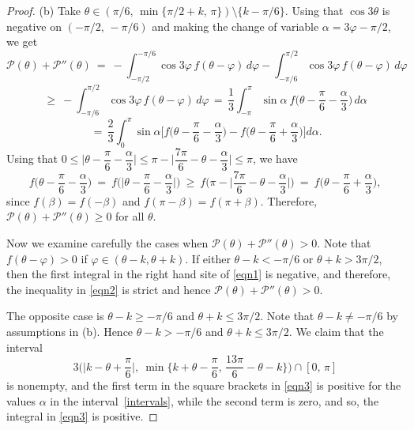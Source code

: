 \documentclass[a4paper,12pt]{article}
\newcommand {\PPP}{\mathcal{P}}
\theoremstyle{remark}
\theoremstyle{definition}
\begin{document}
\begin{proof}
(b) Take $\theta \in (\pi/6,\, \min\{\pi/2 + k,\, \pi \}) \setminus \{ k-\pi/6 \}$. Using that $\cos 3\theta$ is negative on $(-\pi/2,\, -\pi/6)$ and making the change of variable $\alpha = 3\varphi - \pi/2$, we get
\begin{equation}\label{eqn1}
\PPP(\theta) + \PPP''(\theta)\ =\
-\int_{-\pi/2}^{-\pi/6} \cos 3\varphi\, f(\theta-\varphi)\, d\varphi
-\int_{-\pi/6}^{\pi/2} \cos 3\varphi\, f(\theta-\varphi)\, d\varphi
 \end{equation}
 \begin{equation}\label{eqn2}
 \ge\
-\int_{-\pi/6}^{\pi/2} \cos 3\varphi\, f(\theta-\varphi)\, d\varphi\, =\,
\dfrac{1}{3}\int_{-\pi}^{\pi} \sin\alpha\ f\Big(\theta - \frac{\pi}{6} - \dfrac{\alpha}{3} \Big)\, d\alpha
\end{equation}
 \begin{equation}\label{eqn3}
\, =\,
\dfrac{2}{3}\int_{0}^{\pi} \sin\alpha
\Big[ f\Big(\theta - \frac{\pi}{6} - \dfrac{\alpha}{3} \Big) - f\Big(\theta - \frac{\pi}{6} + \dfrac{\alpha}{3} \Big)
\Big] d\alpha.
\end{equation}
Using that $0 \le \Big|\theta - \dfrac{\pi}{6} - \dfrac{\alpha}{3}\Big| \le \pi - \Big|\dfrac{7\pi}{6} - \theta - \dfrac{\alpha}{3}\Big| \le \pi$, we have
$$
f\Big(\theta - \dfrac{\pi}{6} - \dfrac{\alpha}{3} \Big)\ =\ f\Big(\Big|\theta - \dfrac{\pi}{6} - \dfrac{\alpha}{3} \Big|\Big)\ \ge\
f\Big(\pi - \Big|\dfrac{7\pi}{6} - \theta - \dfrac{\alpha}{3}\Big|\Big) \ =\ f\Big(\theta - \dfrac{\pi}{6} + \dfrac{\alpha}{3} \Big),$$
since $f(\beta)=f(-\beta)$ and $f(\pi-\beta)=f(\pi+\beta)$. Therefore, $\PPP(\theta) + \PPP''(\theta) \ge 0$ for all $\theta$.

Now we examine carefully the cases when $\PPP(\theta) + \PPP''(\theta) > 0$. Note that $f(\theta-\varphi)>0$ if $\varphi\in(\theta-k,\theta+k)$. If either $\theta - k<-\pi/6$ or $\theta + k > 3\pi/2$, then the first integral in the right hand site of \eqref{eqn1} is negative, and therefore, the inequality in \eqref{eqn2} is strict and hence $\PPP(\theta)+\PPP''(\theta)>0$.

The opposite case is $\theta -k \ge - \pi/6$ and $\theta + k \le 3\pi/2$. Note that $\theta-k\ne-\pi/6$ by assumptions in (b). Hence $\theta -k > - \pi/6$ and $\theta + k \le 3\pi/2$. We claim that the interval
\begin{equation}\label{intervals}
3\Big( \Big|k-\theta+\dfrac{\pi}{6}\Big|, \ \min\big\{ k+\theta-\dfrac{\pi}{6},\, \frac{13\pi}{6}-\theta-k \big\}\Big) \cap [0,\, \pi]
\end{equation}
is nonempty, and the first term in the square brackets in \eqref{eqn3} is positive for the values $\alpha$ in the interval~\eqref{intervals}, while the second term is zero, and so, the integral in \eqref{eqn3} is positive.


\end{proof}
\end{document}
